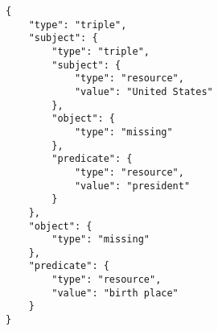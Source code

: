 \begin{verbatim}
{
    "type": "triple",
    "subject": {
        "type": "triple",
        "subject": {
            "type": "resource",
            "value": "United States"
        },
        "object": {
            "type": "missing"
        },
        "predicate": {
            "type": "resource",
            "value": "president"
        }
    },
    "object": {
        "type": "missing"
    },
    "predicate": {
        "type": "resource",
        "value": "birth place"
    }
}

\end{verbatim}
